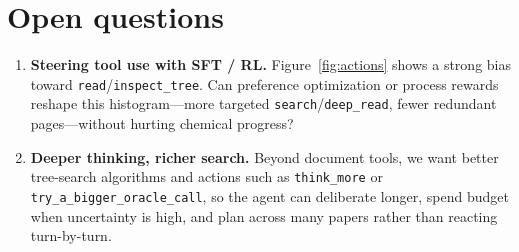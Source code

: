 \documentclass[11pt]{article}
\begin{document}
\section*{Open questions}
\begin{enumerate}[leftmargin=1.4em]
  \item \textbf{Steering tool use with SFT / RL.} Figure~\ref{fig:actions} shows a strong bias toward \texttt{read}/\texttt{inspect\_tree}. Can preference optimization or process rewards reshape this histogram---more targeted \texttt{search}/\texttt{deep\_read}, fewer redundant pages---without hurting chemical progress?
  \item \textbf{Deeper thinking, richer search.} Beyond document tools, we want better tree-search algorithms and actions such as \texttt{think\_more} or \texttt{try\_a\_bigger\_oracle\_call}, so the agent can deliberate longer, spend budget when uncertainty is high, and plan across many papers rather than reacting turn-by-turn.
\end{enumerate}
\end{document}
